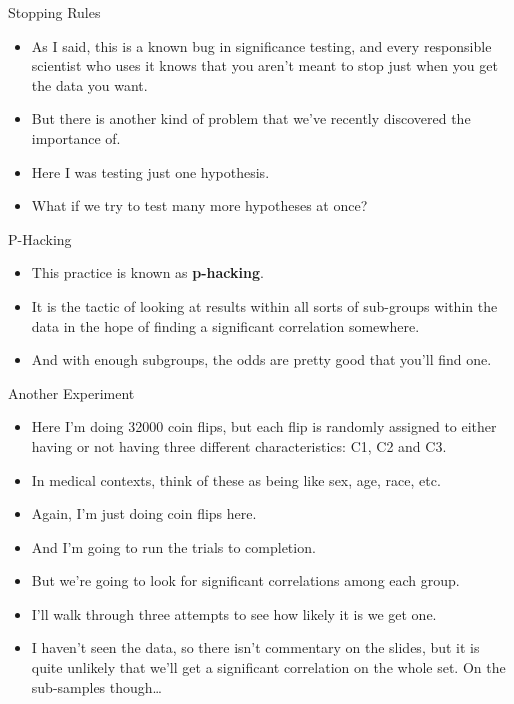 \documentclass[
  ignorenonframetext,
]{beamer}
\providecommand{\tightlist}{%
  \setlength{\itemsep}{0pt}\setlength{\parskip}{0pt}}
\renewcommand{\,}{\text{, }}
\begin{document}
\begin{frame}{Stopping Rules}
\protect\hypertarget{stopping-rules-1}{}

\begin{itemize}
\tightlist
\item
  As I said, this is a known bug in significance testing, and every
  responsible scientist who uses it knows that you aren't meant to stop
  just when you get the data you want.
\item
  But there is another kind of problem that we've recently discovered
  the importance of.
\item
  Here I was testing just one hypothesis.
\item
  What if we try to test many more hypotheses at once?
\end{itemize}

\end{frame}

\begin{frame}{P-Hacking}
\protect\hypertarget{p-hacking}{}

\begin{itemize}
\tightlist
\item
  This practice is known as \textbf{p-hacking}.
\item
  It is the tactic of looking at results within all sorts of sub-groups
  within the data in the hope of finding a significant correlation
  somewhere.
\item
  And with enough subgroups, the odds are pretty good that you'll find
  one.
\end{itemize}

\end{frame}

\begin{frame}{Another Experiment}
\protect\hypertarget{another-experiment}{}

\begin{itemize}
\tightlist
\item
  Here I'm doing 32000 coin flips, but each flip is randomly assigned to
  either having or not having three different characteristics: C1, C2
  and C3.
\item
  In medical contexts, think of these as being like sex, age, race, etc.
\item
  Again, I'm just doing coin flips here.
\item
  And I'm going to run the trials to completion.
\item
  But we're going to look for significant correlations among each group.
\item
  I'll walk through three attempts to see how likely it is we get one.
\item
  I haven't seen the data, so there isn't commentary on the slides, but
  it is quite unlikely that we'll get a significant correlation on the
  whole set. On the sub-samples though\ldots{}
\end{itemize}

\end{frame}
\end{document}
